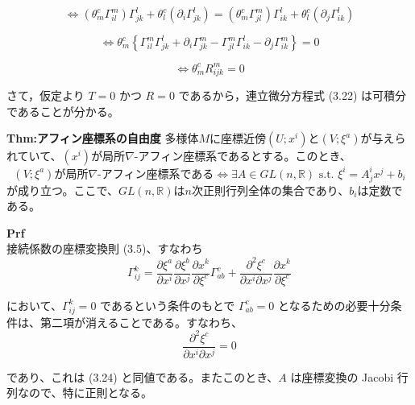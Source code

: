 \documentclass[a4paper,11pt]{jsarticle}
\numberwithin{equation}{section}
\begin{document}
\begin{equation}
    \iff (\theta^c_m \Gamma^m_{il}) \Gamma^l_{jk} + \theta^c_l \left( \partial_i \Gamma^l_{jk} \right) = (\theta^c_m \Gamma^m_{jl}) \Gamma^l_{ik} + \theta^c_l \left( \partial_j \Gamma^l_{ik} \right)
\end{equation}

\begin{equation}
    \iff \theta^c_m \left\{ \Gamma^m_{il} \Gamma^l_{jk} + \partial_i \Gamma^m_{jk} - \Gamma^m_{jl} \Gamma^l_{ik} - \partial_j \Gamma^m_{ik} \right\} = 0
\end{equation}

\begin{equation}
    \iff \theta^c_m R^m_{ijk} = 0
\end{equation}

さて，仮定より \(T = 0\) かつ \(R = 0\) であるから，連立微分方程式 (3.22) は可積分であることが分かる。

\begin{itembox}[l]{\textbf{Thm:アフィン座標系の自由度}}
    多様体$M$に座標近傍$(U;x^i)$と$(V;\xi^a)$が与えられていて、$(x^i)$が局所$\nabla$-アフィン座標系であるとする。このとき、
    \begin{equation}
        (V;\xi^a)\text{が局所$\nabla$-アフィン座標系である} \Leftrightarrow \exists A \in GL(n,\mathbb{R}) \text{ s.t. } \xi^i = A^i_jx^j + b_i
    \end{equation}
    が成り立つ。ここで、$GL(n,\mathbb{R})$は$n$次正則行列全体の集合であり、$b_i$は定数である。
\end{itembox}
\textbf{Prf}\\
接続係数の座標変換則 (3.5)、すなわち
\begin{equation}
    \Gamma^k_{ij} = \frac{\partial \xi^a}{\partial x^i} \frac{\partial \xi^b}{\partial x^j} \frac{\partial x^k}{\partial \xi^c} \Gamma^c_{ab} + \frac{\partial^2 \xi^c}{\partial x^i \partial x^j} \frac{\partial x^k}{\partial \xi^c}
\end{equation}

において、\(\Gamma^k_{ij} = 0\) であるという条件のもとで \(\Gamma^c_{ab} = 0\) となるための必要十分条件は、第二項が消えることである。すなわち、
\begin{equation}
    \frac{\partial^2 \xi^c}{\partial x^i \partial x^j} = 0
\end{equation}

であり、これは (3.24) と同値である。またこのとき、\(A\) は座標変換の Jacobi 行列なので、特に正則となる。\hfill\qedsymbol
\end{document}
